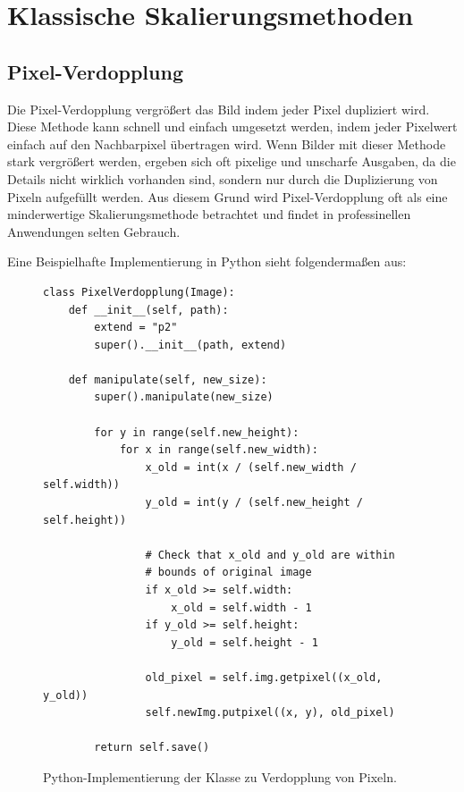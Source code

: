 \usepackage{amsmath}
\usepackage{amssymb}
\chapter{Klassische Skalierungsmethoden}

\section{Pixel-Verdopplung}
Die Pixel-Verdopplung vergrößert das Bild indem jeder Pixel dupliziert wird.
Diese Methode kann schnell und einfach umgesetzt werden, indem jeder Pixelwert einfach auf den Nachbarpixel übertragen wird. 
Wenn Bilder mit dieser Methode stark vergrößert werden, ergeben sich oft pixelige und unscharfe Ausgaben, da die Details nicht wirklich vorhanden sind, sondern nur durch die Duplizierung von Pixeln aufgefüllt werden. 
Aus diesem Grund wird Pixel-Verdopplung oft als eine minderwertige Skalierungsmethode betrachtet und findet in professinellen Anwendungen selten Gebrauch.


\newpage
Eine Beispielhafte Implementierung in Python sieht folgendermaßen aus: 

\begin{figure}
    \centering
    \begin{lstlisting}
class PixelVerdopplung(Image):
    def __init__(self, path):
        extend = "p2"
        super().__init__(path, extend)
    
    def manipulate(self, new_size):
        super().manipulate(new_size)
    
        for y in range(self.new_height):
            for x in range(self.new_width):
                x_old = int(x / (self.new_width / self.width))
                y_old = int(y / (self.new_height / self.height))
    
                # Check that x_old and y_old are within
                # bounds of original image
                if x_old >= self.width:
                    x_old = self.width - 1
                if y_old >= self.height:
                    y_old = self.height - 1
    
                old_pixel = self.img.getpixel((x_old, y_old))
                self.newImg.putpixel((x, y), old_pixel)
    
        return self.save()
\end{lstlisting}
    \caption{Python-Implementierung der Klasse zu Verdopplung von Pixeln.}
    \label{fig:my_label}
\end{figure}



